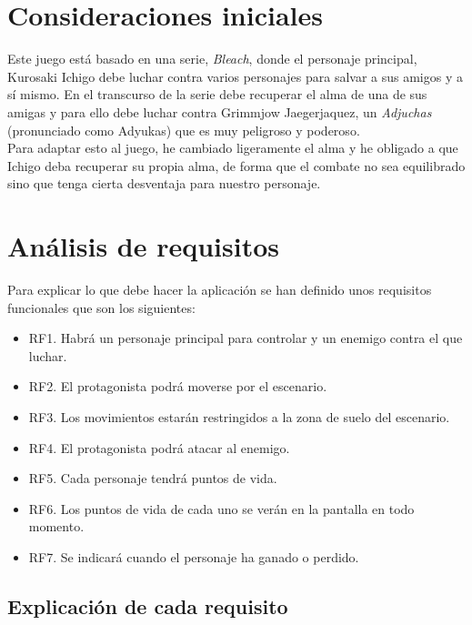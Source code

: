 \documentclass[11pt,a4paper]{article}
\begin{document}
\newpage

\section{Consideraciones iniciales}

Este juego está basado en una serie, \textit{Bleach}, donde el personaje principal, Kurosaki Ichigo debe luchar contra varios personajes para salvar a sus amigos y a sí mismo. En el transcurso de la serie debe recuperar el alma de una de sus amigas y para ello debe luchar contra Grimmjow  Jaegerjaquez, un \textit{Adjuchas} (pronunciado como Adyukas) que es muy peligroso y poderoso.\\

Para adaptar esto al juego, he cambiado ligeramente el alma y he obligado a que Ichigo deba recuperar su propia alma, de forma que el combate no sea equilibrado sino que tenga cierta desventaja para nuestro personaje.

\section{Análisis de requisitos}

Para explicar lo que debe hacer la aplicación se han definido unos requisitos funcionales que son los siguientes:

\begin{itemize}
	\item RF1. Habrá un personaje principal para controlar y un enemigo contra el que luchar.
	\item RF2. El protagonista podrá moverse por el escenario.
	\item RF3. Los movimientos estarán restringidos a la zona de suelo del escenario.
	\item RF4. El protagonista podrá atacar al enemigo.
	\item RF5. Cada personaje tendrá puntos de vida.
	\item RF6. Los puntos de vida de cada uno se verán en la pantalla en todo momento.
	\item RF7. Se indicará cuando el personaje ha ganado o perdido.
\end{itemize}

\subsection{Explicación de cada requisito}
\end{document}
